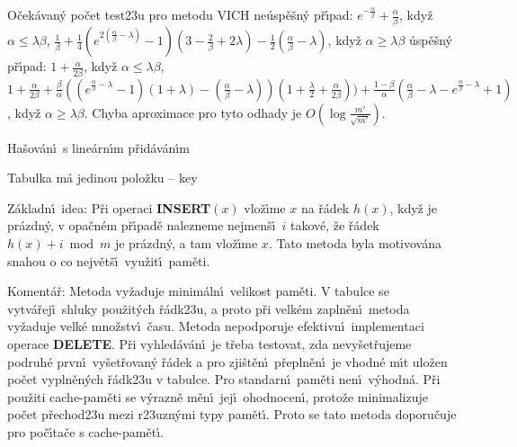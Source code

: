 \flushpar O\v cek\'avan\'y po\v cet test\accent23u pro metodu VICH\newline 
ne\'usp\v e\v sn\'y p\v r\'\i pad:\newline 
\phantom{---}$e^{-\frac {\alpha}{\beta}}+\frac {
\alpha}{\beta}$, kdy\v z  $\alpha\le\lambda\beta$, \newline 
\phantom{---}$\frac 1{\beta}+\frac 14(e^{2(\frac {\alpha}{\beta}-\lambda )}-1)
(3-\frac 2{\beta}+2\lambda )-\frac 12(\frac {\alpha}{\beta}-\lambda 
)$, kdy\v z $\alpha\ge\lambda\beta$\newline 
\'usp\v e\v sn\'y p\v r\'\i pad:\newline 
\phantom{---}$1+\frac {\alpha}{2\beta}$, kdy\v z $
\alpha\le\lambda\beta$, \newline 
\phantom{---}$1+\frac {\alpha}{2\beta}+\frac {\beta}{\alpha}((e^{\frac {\alpha}{
\beta}-\lambda}-1)(1+\lambda )-(\frac {\alpha}{\beta}-\lambda ))(
1+\frac {\lambda}2+\frac {\alpha}{2\beta}))+\frac {1-\beta}{\alpha}
(\frac {\alpha}{\beta}-\lambda -e^{\frac {\alpha}{\beta}-\lambda}
+1)$, 
kdy\v z $\alpha\ge\lambda\beta$.
\medskip
\flushpar Chyba aproximace pro tyto odhady je $O(\log\frac {m'}{\sqrt {
m'}})$.


\heading
Ha\v sov\'an\'\i\ s line\'arn\'\i m p\v rid\'av\'an\'\i m
\endheading

\flushpar Tabulka m\'a jedinou polo\v zku -- key
\medskip

\flushpar Z\'akladn\'\i\ idea:  P\v ri operaci {\bf INSERT$(x)$} vlo\v z\'\i me $
x$ 
na \v r\'adek $h(x)$, kdy\v z je pr\'azdn\'y, v opa\v cn\'em p\v r\'\i pad\v e 
nalezneme nejmen\v s\'\i\ $i$ takov\'e, \v ze \v r\'adek $h(x)+i\bmod 
m$ je 
pr\'azdn\'y, a tam vlo\v z\'\i me $x$. Tato metoda byla motivov\'ana snahou o co nejv\v et\v s\'\i\ vyu\v zit\'\i\ pam\v eti. 
\medskip

\flushpar Koment\'a\v r:  Metoda vy\v zaduje minim\'aln\'\i\ velikost pam\v eti.  
V tabulce se vytv\'a\v rej\'\i\ shluky pou\v zit\'ych \v r\'adk\accent23u, a proto 
p\v ri velk\'em zapln\v en\'\i\ metoda vy\v zaduje velk\'e mno\v zstv\'\i\ \v casu.  
Metoda nepodporuje efektivn\'\i\ implementaci operace {\bf DELETE}.  
P\v ri vy\-hle\-d\'a\-v\'a\-n\'\i\ je t\v reba testovat, zda nevy\v set\v rujeme 
podruh\'e prvn\'\i\ vy\v set\v rovan\'y \v r\'adek a pro zji\v st\v en\'\i\ p\v repln\v en\'\i\ je 
vhodn\'e m\'\i t ulo\v zen po\v cet vypln\v en\'ych \v r\'adk\accent23u v tabulce. Pro standarn\'\i\ pam\v eti nen\'\i\ v\'yhodn\'a. P\v ri pou\v ziti cache-pam\v eti se v\'yrazn\v e m\v en\'\i\ jej\'\i\ ohodnocen\'\i, proto\v ze minimalizuje po\v cet p\v rechod\accent23u mezi r\accent23uzn\'ymi typy pam\v et\'\i. Proto se tato metoda doporu\v cuje pro po\v c\'\i ta\v ce s cache-pam\v et\'\i.
\medskip


